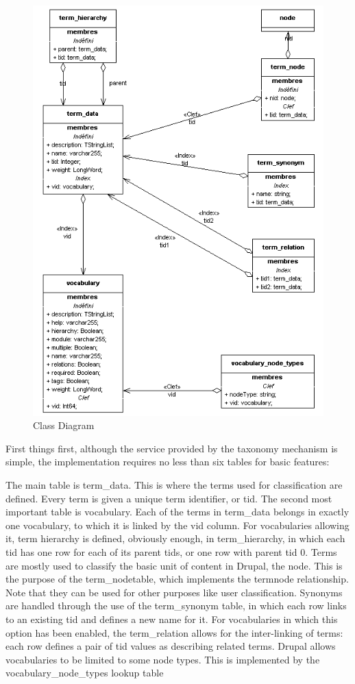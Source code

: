 \begin{figure}[H]
\centering
\includegraphics[width=14cm]{Chapter2/class_diagram.png}
\caption{Class Diagram}
\label{fig:class_diagram}
\end{figure}

First things first, although the service provided by the taxonomy mechanism is simple, the implementation requires no less than six tables for basic features:

The main table is term\_data. This is where the terms used for classification are defined. Every term is given a unique term identifier, or tid.
The second most important table is vocabulary. Each of the terms in term\_data belongs in exactly one vocabulary, to which it is linked by the vid column.
For vocabularies allowing it, term hierarchy is defined, obviously enough, in term\_hierarchy, in which each tid has one row for each of its parent tids, or one row with parent tid 0.
Terms are mostly used to classify the basic unit of content in Drupal, the node. This is the purpose of the term\_nodetable, which implements the term\/node relationship. Note that they can be used for other purposes like user classification.
Synonyms are handled through the use of the term\_synonym table, in which each row links to an existing tid and defines a new name for it.
For vocabularies in which this option has been enabled, the term\_relation allows for the inter-linking of terms: each row defines a pair of tid values as describing related terms.
Drupal allows vocabularies to be limited to some node types. This is implemented by the vocabulary\_node\_types lookup table

